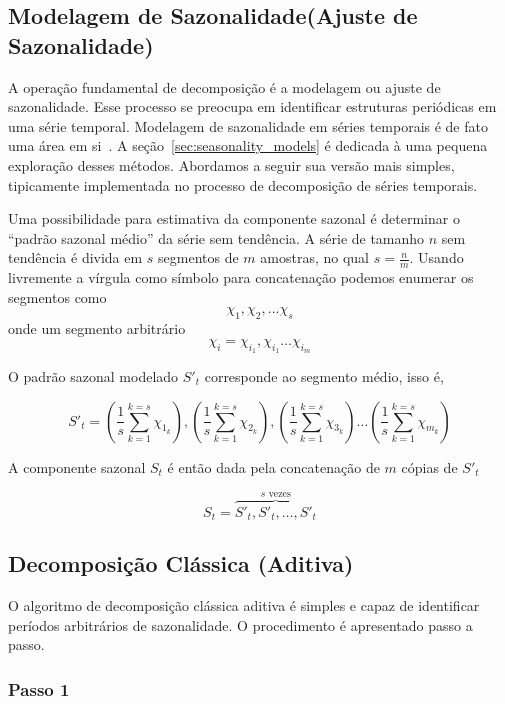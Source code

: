 \subsection{Modelagem de Sazonalidade(Ajuste de Sazonalidade)}\label{ssec:mean_season}

A operação fundamental de decomposição é a modelagem ou ajuste de sazonalidade.
Esse processo se preocupa em identificar estruturas periódicas em uma série
temporal. Modelagem de sazonalidade em séries temporais é de fato uma área em
si~\cite{seasonal_modelling}. A seção~\ref{sec:seasonality_models} é dedicada
à uma pequena exploração desses métodos. Abordamos a seguir sua versão mais
simples, tipicamente implementada no processo de decomposição de séries
temporais.

Uma possibilidade para estimativa da componente sazonal é determinar o ``padrão
sazonal médio'' da série sem tendência. A série de tamanho $n$ sem tendência é
divida em $s$ segmentos de $m$ amostras, no qual $s = \frac{n}{m}$. Usando
livremente a vírgula como símbolo para concatenação podemos enumerar os
segmentos como $$\chi_1, \chi_2, ... \chi_s$$ onde um segmento arbitrário
$$\chi_i = \chi_{i_{1}}, \chi_{i_{1}} ... \chi_{i_{m}}$$

O padrão sazonal modelado $S'_t$ corresponde ao segmento médio, isso é,

$$ S'_t = \left(\frac{1}{s} \sum_{k=1}^{k=s} \chi_{1_{k}}\right), \left(\frac{1}{s} \sum_{k=1}^{k=s} \chi_{2_{k}}\right), \left(\frac{1}{s} \sum_{k=1}^{k=s} \chi_{3_{k}}\right) \hdots \left(\frac{1}{s} \sum_{k=1}^{k=s} \chi_{m_{k}}\right)$$

A componente sazonal $S_t$ é então dada pela concatenação de $m$ cópias de
$S'_t$

$$ S_t = \overbrace{S'_t, S'_t, \hdots, S'_t}^{s\text{ vezes}} $$

\subsection{Decomposição Clássica (Aditiva)}\label{ssec:classical_decomposition}

O algoritmo de decomposição clássica aditiva é simples e capaz de identificar
períodos arbitrários de sazonalidade. O procedimento é apresentado passo a
passo.

\subsubsection{Passo 1}

